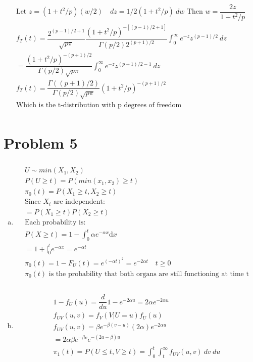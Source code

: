 \documentclass{article}
\newcommand{\dx}{\mathrm{d}x}
\begin{document}
\begin{flushleft}
\begin{enumerate}[(a)]
\begin{multline*}
\text{Let } z=(1+t^2/p)(w/2) \quad dz=1/2(1+t^2/p) \ dw \text{ Then } w=\dfrac{2z}{1+t^2/p}\\
f_T(t)=\dfrac{2^{(p-1)/2+1}}{\sqrt{p\pi}}\dfrac{(1+t^2/p)^{-[(p-1)/2+1]}}{\Gamma(p/2)2^{(p+1)/2}}\int_{0}^{\infty}e^{-z}z^{(p-1)/2} \ dz\\
=\dfrac{(1+t^2/p)^{-(p+1)/2}}{\Gamma(p/2)\sqrt{p\pi}}\int_{0}^{\infty}e^{-z}z^{(p+1)/2-1} \ dz\\
f_T(t)=\dfrac{\Gamma((p+1)/2)}{\Gamma(p/2)\sqrt{p\pi}}(1+t^2/p)^{-(p+1)/2}\\
\text{Which is the t-distribution with p degrees of freedom}\\ 
\end{multline*}
\end{enumerate}
\section*{Problem 5}
\begin{enumerate}[(a)]
\item 
\begin{multline*}\\
U\sim min(X_1,X_2)\\
P(U\geq t)=P(min(x_1,x_2)\geq t)\\
\pi_0(t)=P(X_1\geq t, X_2 \geq t)\\
\text{Since } X_i \text{ are independent:}\\
=P(X_1\geq t)P(X_2\geq t)\\
\text{Each probability is:}\\
P(X\geq t)=1-\int_{0}^{t}\alpha e^{-\alpha x} \dx\\
=1+\bigg|_0^t e^{-\alpha x}=e^{-\alpha t}\\
\pi_0(t)=1-F_U(t)=e^{(-\alpha t)^2}=e^{-2\alpha t} \quad t\geq 0\\
\pi_0(t) \text{ is the probability that both organs are still functioning at time t}\\
\end{multline*}
\item 
\begin{multline*}\\
1-f_U(u)=\dfrac{d}{du}1-e^{-2\alpha u}=2\alpha e^{-2\alpha u}\\
f_{UV}(u,v)=f_V(V|U=u)f_U(u)\\
f_{UV}(u,v)=\beta e^{-\beta(v-u)}(2\alpha)e^{-2\alpha u}\\
=2\alpha \beta e^{-\beta v}e^{-(2a-\beta)u}\\
\pi_1(t)=P(U\leq t,V\geq t)=\int_{0}^{t}\int_{t}^{\infty}f_{UV}(u,v)\ dv \ du \\

\end{multline*}
\end{enumerate}
\end{flushleft}
\end{document}
